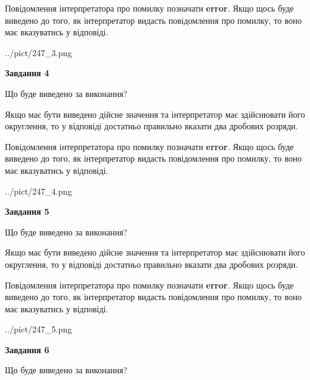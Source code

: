 \documentclass[12pt, ukrainian]{article}
\begin{document}
{\begin {Large}
Повідомлення інтерпретатора про помилку позначати \textbf{error}.
Якщо щось буде виведено до того, як інтерпретатор видасть повідомлення про помилку, 
то воно має вказуватись у відповіді. \par

\begin{center}
	{../pict/247_3.png}
\end{center}
\newpage

{\begin {center}\textbf{Завдання 4}\end {center}}\par
Що буде виведено за виконання? \par

Якщо має бути виведено дійсне значення та інтерпретатор має здійснювати його округлення, 
то у відповіді достатньо правильно вказати два дробових розряди.

Повідомлення інтерпретатора про помилку позначати \textbf{error}.
Якщо щось буде виведено до того, як інтерпретатор видасть повідомлення про помилку, 
то воно має вказуватись у відповіді. \par

\begin{center}
	{../pict/247_4.png}
\end{center}
\newpage

{\begin {center}\textbf{Завдання 5}\end {center}}\par
Що буде виведено за виконання? \par

Якщо має бути виведено дійсне значення та інтерпретатор має здійснювати його округлення, 
то у відповіді достатньо правильно вказати два дробових розряди.

Повідомлення інтерпретатора про помилку позначати \textbf{error}.
Якщо щось буде виведено до того, як інтерпретатор видасть повідомлення про помилку, 
то воно має вказуватись у відповіді. \par

\begin{center}
	{../pict/247_5.png}
\end{center}
\newpage

{\begin {center}\textbf{Завдання 6}\end {center}}\par
Що буде виведено за виконання? \par


\end{Large}}
\end{document}
